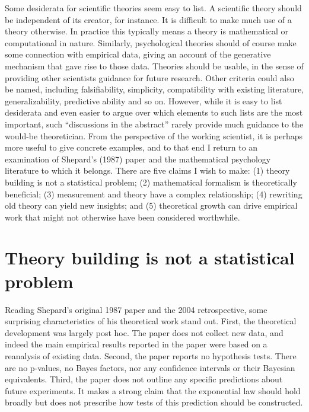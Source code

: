 \documentclass[
  english,
  doc]{apa6}
\begin{document}
Some desiderata for scientific theories seem easy to list. A scientific theory should be independent of its creator, for instance. It is difficult to make much use of a theory otherwise. In practice this typically means a theory is mathematical or computational in nature. Similarly, psychological theories should of course make some connection with empirical data, giving an account of the generative mechanism that gave rise to those data. Theories should be usable, in the sense of providing other scientists guidance for future research. Other criteria could also be named, including falsifiability, simplicity, compatibility with existing literature, generalizability, predictive ability and so on. However, while it is easy to list desiderata and even easier to argue over which elements to such lists are the most important, such ``discussions in the abstract'' rarely provide much guidance to the would-be theoretician. From the perspective of the working scientist, it is perhaps more useful to give concrete examples, and to that end I return to an examination of Shepard's (1987) paper and the mathematical psychology literature to which it belongs. There are five claims I wish to make: (1) theory building is not a statistical problem; (2) mathematical formalism is theoretically beneficial; (3) measurement and theory have a complex relationship; (4) rewriting old theory can yield new insights; and (5) theoretical growth can drive empirical work that might not otherwise have been considered worthwhile.

\hypertarget{theory-building-is-not-a-statistical-problem}{%
\section{Theory building is not a statistical problem}\label{theory-building-is-not-a-statistical-problem}}

\noindent
Reading Shepard's original 1987 paper and the 2004 retrospective, some surprising characteristics of his theoretical work stand out. First, the theoretical development was largely post hoc. The paper does not collect new data, and indeed the main empirical results reported in the paper were based on a reanalysis of existing data. Second, the paper reports no hypothesis tests. There are no p-values, no Bayes factors, nor any confidence intervals or their Bayesian equivalents. Third, the paper does not outline any specific predictions about future experiments. It makes a strong claim that the exponential law should hold broadly but does not prescribe how tests of this prediction should be constructed.
\end{document}
